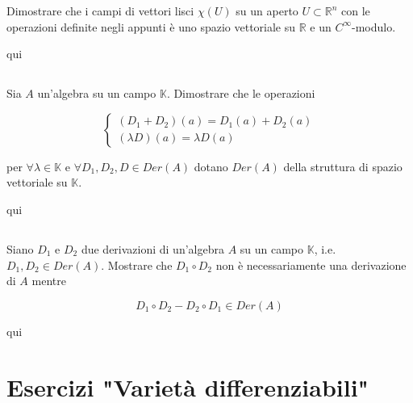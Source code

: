 \begin{tcolorbox}
	Dimostrare che i campi di vettori lisci $ \chi(U) $ su un aperto $ U \subset \mathbb{R}^{n} $ con le operazioni definite negli appunti è uno spazio vettoriale su $ \mathbb{R} $ e un $ C^{\infty} $-modulo.
\end{tcolorbox}

qui

\tocless\section{}\label{es1-10}

\begin{tcolorbox}
	Sia $ A $ un'algebra su un campo $ \mathbb{K} $. Dimostrare che le operazioni
	
	\begin{equation}
		\begin{cases}
			(D_{1}+D_{2})(a) = D_{1}(a) + D_{2}(a)\\
			(\lambda D)(a) = \lambda D(a)
		\end{cases}
	\end{equation}
	
	per $ \forall \lambda \in \mathbb{K} $ e $ \forall D_{1},D_{2},D \in Der(A) $ dotano $ Der(A) $ della struttura di spazio vettoriale su $ \mathbb{K} $.
\end{tcolorbox}

qui

\tocless\section{}\label{es1-11}

\begin{tcolorbox}
	Siano $ D_{1} $ e $ D_{2} $ due derivazioni di un'algebra $ A $ su un campo $ \mathbb{K} $, i.e. $ D_{1},D_{2} \in Der(A) $. Mostrare che $ D_{1} \circ D_{2} $ non è necessariamente una derivazione di $ A $ mentre
	
	\begin{equation}
		D_{1} \circ D_{2} - D_{2} \circ D_{1} \in Der(A)
	\end{equation}
\end{tcolorbox}

qui

\chapter{Esercizi "Varietà differenziabili"}

\tocless\section{}\label{BONUS2-1}

